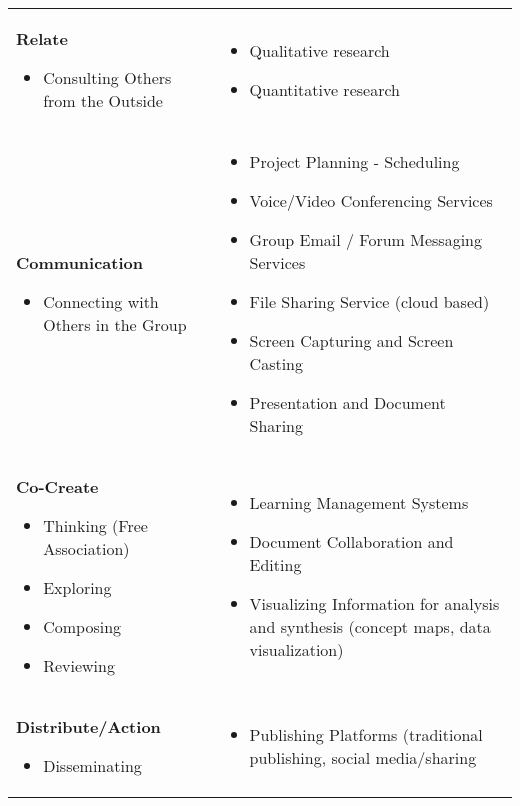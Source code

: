 {\begin{tabular}{|p{}p{}@{\hspace{.2in}}|}
\textbf{Relate}
\begin{itemize}[noitemsep]
\item
  Consulting Others from the Outside
\end{itemize} &
\begin{itemize}[noitemsep]
\item
  Qualitative research
\item
  Quantitative research
\end{itemize} \\
\textbf{Communication}
\begin{itemize}[noitemsep]
\item
  Connecting with Others in the Group
\end{itemize} &
\begin{itemize}[noitemsep]
\item
  Project Planning - Scheduling
\item
  Voice/Video Conferencing Services
\item
  Group Email / Forum Messaging Services
\item
  File Sharing Service (cloud based)
\item
  Screen Capturing and Screen Casting
\item
  Presentation and Document Sharing
\end{itemize} \\
\textbf{Co-Create}
\begin{itemize}[noitemsep]
\item
  Thinking (Free Association)
\item
  Exploring
\item
  Composing
\item
  Reviewing
\end{itemize} &
\begin{itemize}[noitemsep]
\item
  Learning Management Systems
\item
  Document Collaboration and Editing
\item
  Visualizing Information for analysis and synthesis (concept maps, data
  visualization)
\end{itemize} \\
\textbf{Distribute/Action}
\begin{itemize}[noitemsep]
\item
  Disseminating
\end{itemize} &
\begin{itemize}[noitemsep]
\item
  Publishing Platforms (traditional publishing, social media/sharing

\end{itemize}
\end{tabular}}
